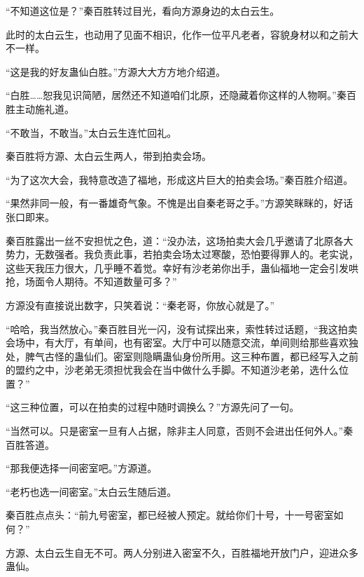 \begin{this_body}
“不知道这位是？”秦百胜转过目光，看向方源身边的太白云生。

此时的太白云生，也动用了见面不相识，化作一位平凡老者，容貌身材以和之前大不一样。

“这是我的好友蛊仙白胜。”方源大大方方地介绍道。

“白胜……恕我见识简陋，居然还不知道咱们北原，还隐藏着你这样的人物啊。”秦百胜主动施礼道。

“不敢当，不敢当。”太白云生连忙回礼。

秦百胜将方源、太白云生两人，带到拍卖会场。

“为了这次大会，我特意改造了福地，形成这片巨大的拍卖会场。”秦百胜介绍道。

“果然非同一般，有一番雄奇气象。不愧是出自秦老哥之手。”方源笑眯眯的，好话张口即来。

秦百胜露出一丝不安担忧之色，道：“没办法，这场拍卖大会几乎邀请了北原各大势力，无数强者。我负责此事，若拍卖会场太过寒酸，恐怕要得罪人的。老实说，这些天我压力很大，几乎睡不着觉。幸好有沙老弟你出手，蛊仙福地一定会引发哄抢，场面令人期待。不知道数量可多？”

方源没有直接说出数字，只笑着说：“秦老哥，你放心就是了。”

“哈哈，我当然放心。”秦百胜目光一闪，没有试探出来，索性转过话题，“我这拍卖会场中，有大厅，有单间，也有密室。大厅中可以随意交流，单间则给那些喜欢独处，脾气古怪的蛊仙们。密室则隐瞒蛊仙身份所用。这三种布置，都已经写入之前的盟约之中，沙老弟无须担忧我会在当中做什么手脚。不知道沙老弟，选什么位置？”

“这三种位置，可以在拍卖的过程中随时调换么？”方源先问了一句。

“当然可以。只是密室一旦有人占据，除非主人同意，否则不会进出任何外人。”秦百胜答道。

“那我便选择一间密室吧。”方源道。

“老朽也选一间密室。”太白云生随后道。

秦百胜点点头：“前九号密室，都已经被人预定。就给你们十号，十一号密室如何？”

方源、太白云生自无不可。两人分别进入密室不久，百胜福地开放门户，迎进众多蛊仙。

\end{this_body}

